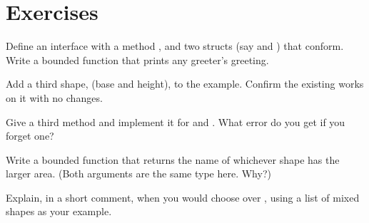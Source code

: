 \section{Exercises}

\exercise Define an interface  with a method , and
two structs (say  and ) that conform. Write a bounded
function that prints any greeter's greeting.

\exercise Add a third shape,  (base and height), to the
 example. Confirm the existing  works on it with no
changes.

\exercise Give  a third method  and implement it
for  and . What error do you get if you forget one?

\exercise Write a bounded function  that
returns the name of whichever shape has the larger area. (Both arguments are the
same type here. Why?)

\exercise Explain, in a short comment, when you would choose  over
, using a list of mixed shapes as your example.
